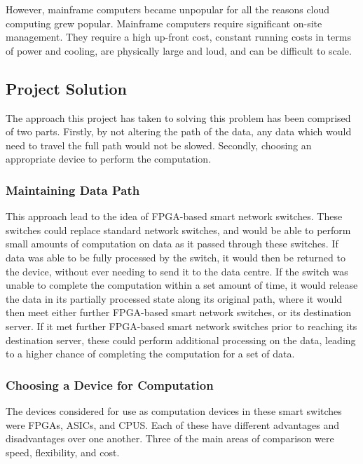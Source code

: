 However, mainframe computers became unpopular for all the reasons cloud computing grew popular. Mainframe computers require significant on-site management. They require a high up-front cost, constant running costs in terms of power and cooling, are physically large and loud, and can be difficult to scale.

\subsection{Project Solution}
\label{project_solution}


The approach this project has taken to solving this problem has been comprised of two parts. Firstly, by not altering the path of the data, any data which would need to travel the full path would not be slowed. Secondly, choosing an appropriate device to perform the computation.

\subsubsection{Maintaining Data Path}

This approach lead to the idea of FPGA-based smart network switches. These switches could replace standard network switches, and would be able to perform small amounts of computation on data as it passed through these switches. If data was able to be fully processed by the switch, it would then be returned to the device, without ever needing to send it to the data centre. If the switch was unable to complete the computation within a set amount of time, it would release the data in its partially processed state along its original path, where it would then meet either further FPGA-based smart network switches, or its destination server. If it met further FPGA-based smart network switches prior to reaching its destination server, these could perform additional processing on the data, leading to a higher chance of completing the computation for a set of data.

\subsubsection{Choosing a Device for Computation}

The devices considered for use as computation devices in these smart switches were FPGAs, ASICs, and CPUS. Each of these have different advantages and disadvantages over one another. Three of the main areas of comparison were speed, flexibility, and cost.

